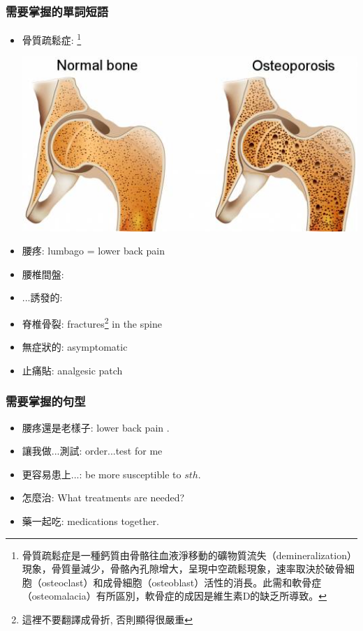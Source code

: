 \subsubsection*{需要掌握的單詞短語}
\begin{multicols}{2}
\begin{itemize}
  \itemsep0em
  \item 骨質疏鬆症: \footnote{骨質疏鬆症是一種鈣質由骨骼往血液淨移動的礦物質流失（demineralization）現象，骨質量減少，骨骼內孔隙增大，呈現中空疏鬆現象，速率取決於破骨細胞（osteoclast）和成骨細胞（osteoblast）活性的消長。此需和軟骨症（osteomalacia）有所區別，軟骨症的成因是維生素D的缺乏所導致。}
  \begin{center}
  	\includegraphics[scale=.5]{pics/osteoporotic}
  \end{center}
  \item 腰疼: lumbago = lower back pain
  \item 腰椎間盤: 
  \item ...誘發的: 
  \item 脊椎骨裂: fractures\footnote{這裡不要翻譯成骨折, 否則顯得很嚴重} in the spine
  \item 無症狀的: asymptomatic
  \item 止痛貼: analgesic patch
\end{itemize}
\end{multicols}

\subsubsection*{需要掌握的句型}
\begin{multicols}{2}
\begin{itemize}
  \itemsep0em
  \item 腰疼還是老樣子: lower back pain .
  \item 讓我做...測試: order...test for me
  \item 更容易患上...: be more susceptible to $sth.$
  \item 怎麼治: What treatments are needed?
  \item 藥一起吃: medications  together.
\end{itemize}
\end{multicols}


